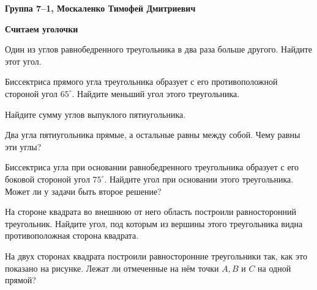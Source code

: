 \documentclass{article}
\begin{document}
    \large

    \begin{center}
        \textbf{Группа 7--1, Москаленко Тимофей Дмитриевич}
    \end{center}
    \begin{center}
        \textbf{Считаем уголочки}
    \end{center}


    \begin{enumerate_boxed}
        \item Один из углов равнобедренного треугольника в два раза больше другого.
        Найдите этот угол.
        \item Биссектриса прямого угла треугольника образует с его противоположной стороной угол $65^\circ$.
        Найдите меньший угол этого треугольника.
        \item Найдите сумму углов выпуклого пятиугольника.
        \item Два угла пятиугольника прямые, а остальные равны между собой.
        Чему равны эти углы?
        \item Биссектриса угла при основании равнобедренного треугольника образует с его боковой стороной угол $75^\circ$.
        Найдите угол при основании этого треугольника.
        Может ли у задачи быть второе решение?
        \item На стороне квадрата во внешнюю от него область построили равносторонний треугольник.
        Найдите угол, под которым из вершины этого треугольника видна противоположная сторона квадрата.
        \item На двух сторонах квадрата построили равносторонние треугольники так, как это показано на рисунке.
        Лежат ли отмеченные на нём точки $A, B$ и $C$ на одной прямой?
    \end{enumerate_boxed}
\end{document}
